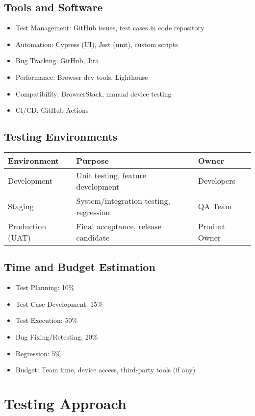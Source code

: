 \documentclass[a4paper,11pt]{scrartcl}
\begin{document}
\subsection{Tools and Software}
\begin{itemize}[leftmargin=*]
    \item Test Management: GitHub issues, test cases in code repository
    \item Automation: Cypress (UI), Jest (unit), custom scripts
    \item Bug Tracking: GitHub, Jira
    \item Performance: Browser dev tools, Lighthouse
    \item Compatibility: BrowserStack, manual device testing
    \item CI/CD: GitHub Actions
\end{itemize}

\subsection{Testing Environments}
\begin{tabularx}{\textwidth}{l X l}
\toprule
Environment & Purpose & Owner \\
\midrule
Development & Unit testing, feature development & Developers \\
Staging & System/integration testing, regression & QA Team \\
Production (UAT) & Final acceptance, release candidate & Product Owner \\
\bottomrule
\end{tabularx}

\subsection{Time and Budget Estimation}
\begin{itemize}[leftmargin=*]
    \item Test Planning: 10\%
    \item Test Case Development: 15\%
    \item Test Execution: 50\%
    \item Bug Fixing/Retesting: 20\%
    \item Regression: 5\%
    \item Budget: Team time, device access, third-party tools (if any)
\end{itemize}

\section{Testing Approach}
\end{document}

